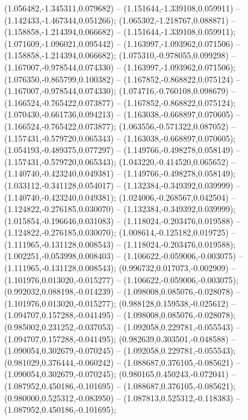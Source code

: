  (1.056482,-1.345311,0.079682) -- (1.151644,-1.339108,0.059911) -- (1.142433,-1.467344,0.051266);
 (1.065302,-1.218767,0.088871) -- (1.158858,-1.214394,0.066682) -- (1.151644,-1.339108,0.059911);
 (1.071609,-1.096021,0.095442) -- (1.163997,-1.093962,0.071506) -- (1.158858,-1.214394,0.066682);
 (1.075310,-0.978055,0.099298) -- (1.167007,-0.978544,0.074330) -- (1.163997,-1.093962,0.071506);
 (1.076350,-0.865799,0.100382) -- (1.167852,-0.868822,0.075124) -- (1.167007,-0.978544,0.074330);
 (1.074716,-0.760108,0.098679) -- (1.166524,-0.765422,0.073877) -- (1.167852,-0.868822,0.075124);
 (1.070430,-0.661736,0.094213) -- (1.163038,-0.668897,0.070605) -- (1.166524,-0.765422,0.073877);
 (1.063556,-0.571322,0.087052) -- (1.157431,-0.579720,0.065343) -- (1.163038,-0.668897,0.070605);
 (1.054193,-0.489375,0.077297) -- (1.149766,-0.498278,0.058149) -- (1.157431,-0.579720,0.065343);
 (1.043220,-0.414520,0.065652) -- (1.140740,-0.423240,0.049381) -- (1.149766,-0.498278,0.058149);
 (1.033112,-0.341128,0.054017) -- (1.132384,-0.349392,0.039999) -- (1.140740,-0.423240,0.049381);
 (1.024006,-0.268567,0.042504) -- (1.124822,-0.276185,0.030070) -- (1.132384,-0.349392,0.039999);
 (1.015854,-0.196646,0.031083) -- (1.118024,-0.203476,0.019588) -- (1.124822,-0.276185,0.030070);
 (1.008614,-0.125182,0.019725) -- (1.111965,-0.131128,0.008543) -- (1.118024,-0.203476,0.019588);
 (1.002251,-0.053998,0.008403) -- (1.106622,-0.059006,-0.003075) -- (1.111965,-0.131128,0.008543);
 (0.996732,0.017073,-0.002909) -- (1.101976,0.013020,-0.015277) -- (1.106622,-0.059006,-0.003075);
 (0.992032,0.088198,-0.014239) -- (1.098008,0.085076,-0.028078) -- (1.101976,0.013020,-0.015277);
 (0.988128,0.159538,-0.025612) -- (1.094707,0.157288,-0.041495) -- (1.098008,0.085076,-0.028078);
 (0.985002,0.231252,-0.037053) -- (1.092058,0.229781,-0.055543) -- (1.094707,0.157288,-0.041495);
 (0.982639,0.303501,-0.048588) -- (1.090054,0.302679,-0.070245) -- (1.092058,0.229781,-0.055543);
 (0.981029,0.376444,-0.060242) -- (1.088687,0.376105,-0.085621) -- (1.090054,0.302679,-0.070245);
 (0.980165,0.450243,-0.072041) -- (1.087952,0.450186,-0.101695) -- (1.088687,0.376105,-0.085621);
 (0.980000,0.525312,-0.083950) -- (1.087813,0.525312,-0.118383) -- (1.087952,0.450186,-0.101695);

